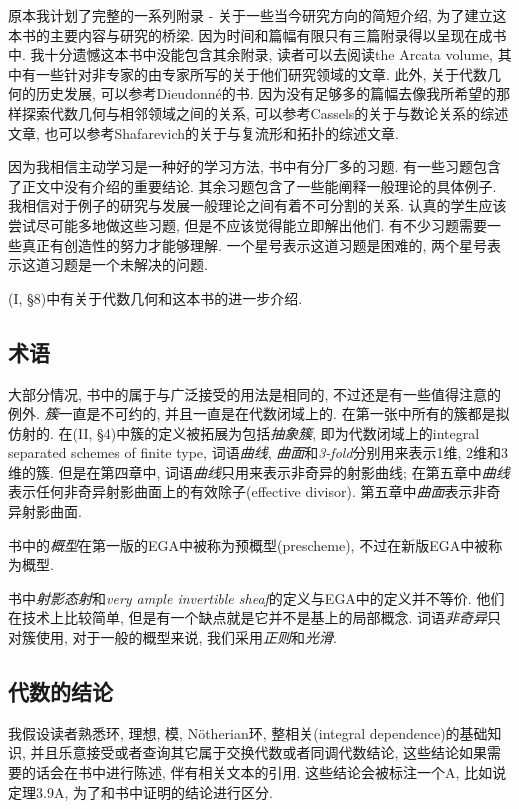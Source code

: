 原本我计划了完整的一系列附录 - 关于一些当今研究方向的简短介绍, 为了建立这本书的主要内容与研究的桥梁. 因为时间和篇幅有限只有三篇附录得以呈现在成书中. 我十分遗憾这本书中没能包含其余附录, 读者可以去阅读the Arcata volume, 其中有一些针对非专家的由专家所写的关于他们研究领域的文章. 此外, 关于代数几何的历史发展, 可以参考Dieudonn\'e的书. 因为没有足够多的篇幅去像我所希望的那样探索代数几何与相邻领域之间的关系, 可以参考Cassels的关于与数论关系的综述文章, 也可以参考Shafarevich的关于与复流形和拓扑的综述文章.

因为我相信主动学习是一种好的学习方法, 书中有分厂多的习题. 有一些习题包含了正文中没有介绍的重要结论. 其余习题包含了一些能阐释一般理论的具体例子. 我相信对于例子的研究与发展一般理论之间有着不可分割的关系. 认真的学生应该尝试尽可能多地做这些习题, 但是不应该觉得能立即解出他们. 有不少习题需要一些真正有创造性的努力才能够理解. 一个星号表示这道习题是困难的, 两个星号表示这道习题是一个未解决的问题.

(I, \S 8)中有关于代数几何和这本书的进一步介绍.

\subsection*{术语}

大部分情况, 书中的属于与广泛接受的用法是相同的, 不过还是有一些值得注意的例外. \emph{簇}一直是不可约的, 并且一直是在代数闭域上的. 在第一张中所有的簇都是拟仿射的. 在(II, \S 4)中簇的定义被拓展为包括\emph{抽象簇}, 即为代数闭域上的integral separated schemes of finite type, 词语\emph{曲线}, \emph{曲面}和\emph{3-fold}分别用来表示1维, 2维和3维的簇. 但是在第四章中, 词语\emph{曲线}只用来表示非奇异的射影曲线; 在第五章中\emph{曲线}表示任何非奇异射影曲面上的有效除子(effective divisor). 第五章中\emph{曲面}表示非奇异射影曲面.

书中的\emph{概型}在第一版的EGA中被称为预概型(prescheme), 不过在新版EGA中被称为概型.

书中\emph{射影态射}和\emph{very ample invertible sheaf}的定义与EGA中的定义并不等价. 他们在技术上比较简单, 但是有一个缺点就是它并不是基上的局部概念. 词语\emph{非奇异}只对簇使用, 对于一般的概型来说, 我们采用\emph{正则}和\emph{光滑}.

\subsection*{代数的结论}

我假设读者熟悉环, 理想, 模, N\"otherian环, 整相关(integral dependence)的基础知识, 并且乐意接受或者查询其它属于交换代数或者同调代数结论, 这些结论如果需要的话会在书中进行陈述, 伴有相关文本的引用. 这些结论会被标注一个A, 比如说定理3.9A, 为了和书中证明的结论进行区分.

